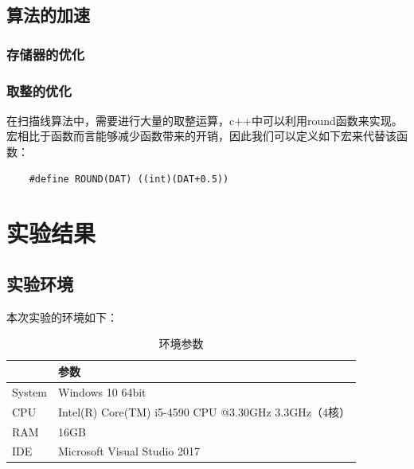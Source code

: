 \documentclass[10pt]{article}
\begin{document}
\subsection{算法的加速}
\subsubsection{存储器的优化}

\subsubsection{取整的优化}
在扫描线算法中，需要进行大量的取整运算，c++中可以利用round函数来实现。宏相比于函数而言能够减少函数带来的开销，因此我们可以定义如下宏来代替该函数：
\begin{lstlisting}
	#define ROUND(DAT) ((int)(DAT+0.5))
\end{lstlisting}




\section{实验结果}
\subsection{实验环境}
本次实验的环境如下：
\begin{table}[H]
\caption{环境参数}
\begin{center}
\begin{tabular}{ll}
\toprule  %
& 参数\\
\midrule  %
System& Windows 10 64bit \\
CPU& Intel(R) Core(TM) i5-4590 CPU @3.30GHz 3.3GHz（4核）\\
RAM& 16GB\\
IDE& Microsoft Visual Studio 2017 \\
\bottomrule %
\end{tabular}
\end{center}
\end{table}
\end{document}
